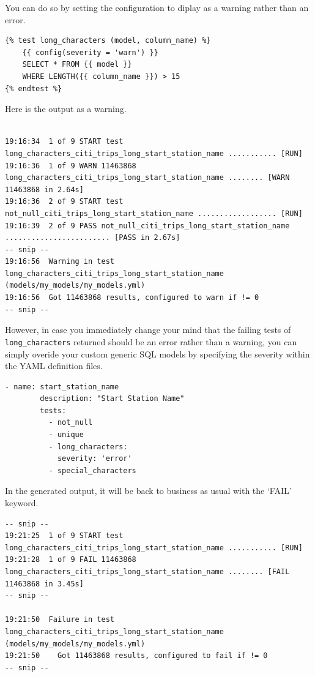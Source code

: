 \documentclass[
]{book}
\begin{document}
You can do so by setting the configuration to diplay as a warning rather than an error.

\begin{verbatim}
{% test long_characters (model, column_name) %}
    {{ config(severity = 'warn') }}
    SELECT * FROM {{ model }}
    WHERE LENGTH({{ column_name }}) > 15 
{% endtest %}
\end{verbatim}

Here is the output as a warning.

\begin{verbatim}

19:16:34  1 of 9 START test long_characters_citi_trips_long_start_station_name ........... [RUN]
19:16:36  1 of 9 WARN 11463868 long_characters_citi_trips_long_start_station_name ........ [WARN 11463868 in 2.64s]
19:16:36  2 of 9 START test not_null_citi_trips_long_start_station_name .................. [RUN]
19:16:39  2 of 9 PASS not_null_citi_trips_long_start_station_name ........................ [PASS in 2.67s]
-- snip --
19:16:56  Warning in test long_characters_citi_trips_long_start_station_name (models/my_models/my_models.yml)
19:16:56  Got 11463868 results, configured to warn if != 0
-- snip --
\end{verbatim}

However, in case you immediately change your mind that the failing tests of \texttt{long\_characters} returned should be an error rather than a warning, you can simply overide your custom generic SQL models by specifying the severity within the YAML definition files.

\begin{verbatim}
- name: start_station_name
        description: "Start Station Name"
        tests:
          - not_null
          - unique
          - long_characters:
            severity: 'error'
          - special_characters
\end{verbatim}

In the generated output, it will be back to business as usual with the `FAIL' keyword.

\begin{verbatim}
-- snip -- 
19:21:25  1 of 9 START test long_characters_citi_trips_long_start_station_name ........... [RUN]
19:21:28  1 of 9 FAIL 11463868 long_characters_citi_trips_long_start_station_name ........ [FAIL 11463868 in 3.45s]
-- snip --

19:21:50  Failure in test long_characters_citi_trips_long_start_station_name (models/my_models/my_models.yml)
19:21:50    Got 11463868 results, configured to fail if != 0
-- snip --
\end{verbatim}
\end{document}
